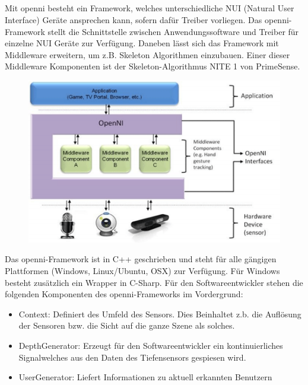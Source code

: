 \subsection{}
\authorsection{\editorhamza}

Mit \gls{openni} besteht ein Framework, welches unterschiedliche NUI (Natural User Interface) Geräte ansprechen kann, sofern dafür Treiber vorliegen. Das \gls{openni}-Framework stellt die Schnittstelle zwischen Anwendungssoftware und Treiber für einzelne NUI Geräte zur Verfügung. Daneben lässt sich das  Framework mit Middleware erweitern, um z.B. Skeleton Algorithmen einzubauen. Einer dieser Middleware Komponenten ist der Skeleton-Algorithmus NITE 1 von PrimeSense.
\begin{figure}
\label{fig:gesten_openni}
\centering
\includegraphics[scale=0.7]{graphics/BILD-OpenNI.png}
\end{figure}
Das \gls{openni}-Framework ist in C++ geschrieben und steht für alle gängigen Plattformen (Windows, Linux/Ubuntu, OSX) zur Verfügung. Für Windows besteht zusätzlich ein Wrapper in C-Sharp.
Für den Softwareentwickler stehen die folgenden Komponenten des \gls{openni}-Frameworks im Vordergrund:

\begin{itemize}
	\item Context:  Definiert des Umfeld des Sensors. Dies Beinhaltet z.b. die Auflösung der Sensoren bzw. die Sicht auf die ganze Szene als solches.
	\item DepthGenerator:  Erzeugt für den Softwareentwickler ein kontinuierliches Signalwelches aus den Daten des Tiefensensors gespiesen wird.
	\item UserGenerator: Liefert Informationen zu aktuell erkannten Benutzern
\end{itemize}

